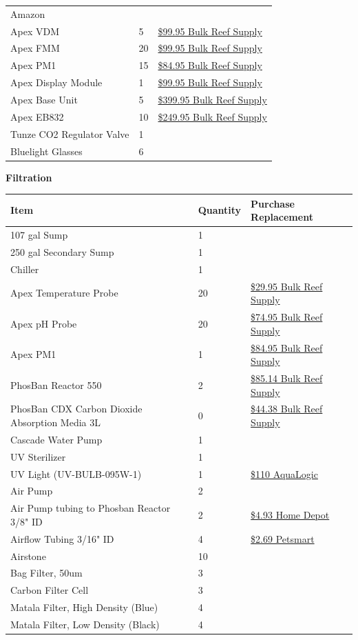 \documentclass[]{book}
\begin{document}
\begin{longtable}[]{@{}lll@{}}
{Amazon}\tabularnewline
Apex VDM & 5 &
\href{https://www.bulkreefsupply.com/led-pumps-control-module-vdm-neptune-systems.html}{\$99.95
Bulk Reef Supply}\tabularnewline
Apex FMM & 20 &
\href{https://www.bulkreefsupply.com/fmm-fluid-monitoring-module-neptune-systems.html}{\$99.95
Bulk Reef Supply}\tabularnewline
Apex PM1 & 15 &
\href{https://www.bulkreefsupply.com/ph-orp-probe-module-pm1-neptune-systems.html}{\$84.95
Bulk Reef Supply}\tabularnewline
Apex Display Module & 1 &
\href{https://www.bulkreefsupply.com/apex-display-module-neptune-systems.html}{\$99.95
Bulk Reef Supply}\tabularnewline
Apex Base Unit & 5 &
\href{https://www.bulkreefsupply.com/apex-controller-base-unit-neptune-systems.html}{\$399.95
Bulk Reef Supply}\tabularnewline
Apex EB832 & 10 &
\href{https://www.bulkreefsupply.com/energybar-832-neptune-systems.html}{\$249.95
Bulk Reef Supply}\tabularnewline
Tunze CO2 Regulator Valve & 1 &\tabularnewline
Bluelight Glasses & 6 &\tabularnewline
\bottomrule
\end{longtable}

 \textbf{Filtration}

\begin{longtable}[]{@{}lll@{}}
\toprule
Item & Quantity & Purchase Replacement\tabularnewline
\midrule
\endhead
107 gal Sump & 1 &\tabularnewline
250 gal Secondary Sump & 1 &\tabularnewline
Chiller & 1 &\tabularnewline
Apex Temperature Probe & 20 &
\href{https://www.bulkreefsupply.com/temperature-probe-neptune-systems.html}{\$29.95
Bulk Reef Supply}\tabularnewline
Apex pH Probe & 20 &
\href{https://www.bulkreefsupply.com/lab-grade-double-junction-ph-probe-neptune-systems.html}{\$74.95
Bulk Reef Supply}\tabularnewline
Apex PM1 & 1 &
\href{https://www.bulkreefsupply.com/ph-orp-probe-module-pm1-neptune-systems.html}{\$84.95
Bulk Reef Supply}\tabularnewline
PhosBan Reactor 550 & 2 &
\href{https://www.bulkreefsupply.com/phosban-reactor-550.html}{\$85.14
Bulk Reef Supply}\tabularnewline
PhosBan CDX Carbon Dioxide Absorption Media 3L & 0 &
\href{https://www.bulkreefsupply.com/cdx-carbon-dioxide-adsorption-media-two-little-fishies.html}{\$44.38
Bulk Reef Supply}\tabularnewline
Cascade Water Pump & 1 &\tabularnewline
UV Sterilizer & 1 &\tabularnewline
UV Light (UV-BULB-095W-1) & 1 &
\href{https://aqualogicinc.com/product/aqua-logic-uv-lamps/}{\$110
AquaLogic}\tabularnewline
Air Pump & 2 &\tabularnewline
Air Pump tubing to Phosban Reactor 3/8" ID & 2 &
\href{https://www.homedepot.com/p/UDP-3-8-in-I-D-x-1-2-in-O-D-x-10-ft-Clear-Vinyl-Tubing-T10006008/304185141}{\$4.93
Home Depot}\tabularnewline
Airflow Tubing 3/16" ID & 4 &
\href{https://www.petsmart.com/fish/filters-and-pumps/air-and-water-pumps/grreat-choice-airline-tubing-5202767.html}{\$2.69
Petsmart}\tabularnewline
Airstone & 10 &\tabularnewline
Bag Filter, 50um & 3 &\tabularnewline
Carbon Filter Cell & 3 &\tabularnewline
Matala Filter, High Density (Blue) & 4 &\tabularnewline
Matala Filter, Low Density (Black) & 4 &\tabularnewline
\bottomrule
\end{longtable}
\end{document}
